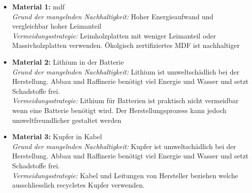 \begin{itemize}
    \item \textbf{Material 1:} \acrfull{mdf} \\
          \textit{Grund der mangelnden Nachhaltigkeit:} Hoher Energieaufwand und vergleichbar hoher Leimanteil  \\
          \textit{Vermeidungsstrategie:} Leimholzplatten mit weniger Leimanteil oder Massivholzplatten verwenden. Ökolgisch zertifiziertes MDF ist nachhaltiger
          
    \item \textbf{Material 2:} Lithium in der Batterie \\
          \textit{Grund der mangelnden Nachhaltigkeit:} Lithium ist umweltschädlich bei der Herstellung. Abbau und Raffinerie benötigt viel Energie und Wasser und setzt Schadstoffe frei. \\
          \textit{Vermeidungsstrategie:} Lithium für Batterien ist praktisch nicht vermeidbar wenn eine Batterie benötigt wird. Der Herstellungsprozess kann jedoch umweltfreundlicher gestaltet werden
          
    \item \textbf{Material 3:} Kupfer in Kabel \\
          \textit{Grund der mangelnden Nachhaltigkeit:} Kupfer ist umweltschädlich bei der Herstellung. Abbau und Raffinerie benötigt viel Energie und Wasser und setzt Schadstoffe frei. \\
          \textit{Vermeidungsstrategie:} Kabel und Leitungen von Hersteller beziehen welche ausschliesslich recycletes Kupfer verwenden.
\end{itemize}

